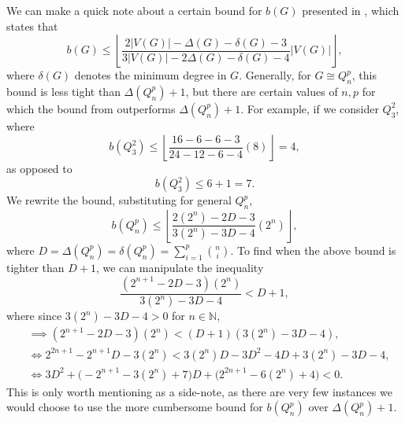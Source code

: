 \documentclass[12pt]{amsart}
\numberwithin{figure}{section}
\theoremstyle{plain}
\begin{document}
\indent We can make a quick note about a certain bound for $b(G)$ presented in \cite{AK11}, which states that
\[b(G) \leq \left\lfloor\frac{2|V(G)|-\Delta(G)-\delta(G)-3}{3|V(G)|-2\Delta(G)-\delta(G)-4}|V(G)|\right\rfloor,\]
where $\delta(G)$ denotes the minimum degree in $G$. Generally, for $G\cong Q_{n}^{p}$, this bound is less tight than $\Delta(Q_{n}^{p}) + 1$, but there are certain values of $n,p$ for which the bound from \cite{AK11} outperforms $\Delta(Q_{n}^{p}) + 1$. For example, if we consider $Q_{3}^{2}$, where
\[b(Q_{3}^{2}) \leq \left\lfloor\frac{16-6-6-3}{24-12-6-4}(8)\right\rfloor = 4,\]
as opposed to
\[b(Q_{3}^{2}) \leq 6 +1 = 7.\]
We rewrite the \cite{AK11} bound, substituting for general $Q_{n}^{p}$,
\[b(Q_{n}^{p}) \leq \left\lfloor\frac{2(2^{n})-2D-3}{3(2^{n})-3D-4}(2^{n})\right\rfloor,\]
where $D = \Delta(Q_{n}^{p}) = \delta(Q_{n}^{p})=\sum_{i=1}^{p}\binom{n}{i}$. To find when the above bound is tighter than $D + 1$, we can manipulate the inequality
\[\frac{(2^{n+1}-2D-3)(2^{n})}{3(2^{n})-3D-4}<D+1,\]
where since $3(2^{n})-3D-4 > 0$ for $n\in\mathbb{N}$,
\begin{align*}
    &\implies (2^{n+1}-2D-3)(2^{n}) < (D+1)(3(2^{n})-3D-4),\\
    &\iff 2^{2n+1}-2^{n+1}D-3(2^{n}) < 3(2^{n})D - 3D^{2}-4D+3(2^{n})-3D-4,\\
    &\iff 3D^{2}+\bigl(-2^{n+1}-3(2^{n})+7\bigr)D + \bigl(2^{2n+1} -6(2^{n})+4\bigr) < 0.
\end{align*}
This is only worth mentioning as a side-note, as there are very few instances we would choose to use the more cumbersome bound for $b(Q_{n}^{p})$ over $\Delta(Q_{n}^{p}) +1$.
\end{document}
